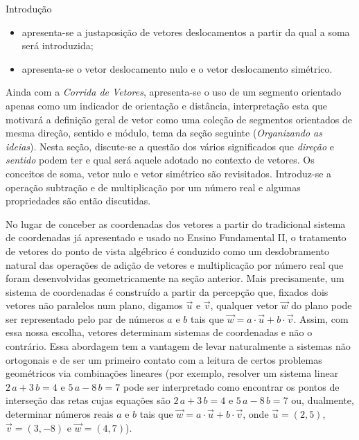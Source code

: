 \begin{apresentacao}{Introdução}
\begin{itemize}
\item {} 
apresenta-se a justaposição de vetores deslocamentos a partir da qual a soma será introduzida;

\item {} 
apresenta-se o vetor deslocamento nulo e o vetor deslocamento simétrico.

\end{itemize}

Ainda com a \textit{Corrida de Vetores}, apresenta-se o uso de um segmento orientado apenas como um indicador de orientação e distância, interpretação esta que motivará a definição geral de vetor como uma coleção de segmentos orientados de mesma direção, sentido e módulo, tema da seção seguinte (\textit{Organizando as ideias}). Nesta seção, discute-se a questão dos vários significados que \textit{direção} e \textit{sentido} podem ter e qual será aquele adotado no contexto de vetores. Os conceitos de soma, vetor nulo e vetor simétrico são revisitados. Introduz-se a operação subtração e de multiplicação por um número real e algumas propriedades são então discutidas.

No lugar de conceber as coordenadas dos vetores a partir do tradicional sistema de coordenadas já apresentado e usado no Ensino Fundamental II, o tratamento de vetores do ponto de vista algébrico é conduzido como um desdobramento natural das operações de adição de vetores e multiplicação por número real que foram desenvolvidas geometricamente na seção anterior. Mais precisamente, um sistema de coordenadas é construído a partir da percepção que, fixados dois vetores não paralelos num plano, digamos \(\vec{u}\) e \(\vec{v}\), qualquer vetor \(\vec{w}\) do plano pode ser representado pelo par de números \(a\) e \(b\) tais que \(\vec{w}=a \cdot \vec{u}+b \cdot \vec{v}\). Assim, com essa nossa escolha, vetores determinam sistemas de coordenadas e não o contrário. Essa abordagem tem a vantagem de levar naturalmente a sistemas não ortogonais e de ser um primeiro contato com a leitura de certos problemas geométricos via combinações lineares (por exemplo, resolver um sistema linear \(2\,a + 3\,b = 4\) e \(5\,a - 8\,b = 7\) pode ser interpretado como encontrar os pontos de interseção das retas cujas equações são \(2\,a + 3\,b = 4\) e \(5\,a - 8\,b = 7\) ou, dualmente, determinar números reais \(a\) e \(b\) tais que \(\vec{w} = a \cdot \vec{u} + b \cdot \vec{v}\), onde \(\vec{u} = (2, 5)\), \(\vec{v} = (3, -8)\) e \(\vec{w} = (4, 7)\)).


\end{apresentacao}
